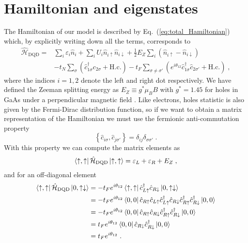 \section{Hamiltonian and eigenstates}
The Hamiltonian of our model is described by Eq.~(\ref{eq:total_Hamiltonian}) which, by explicitly writing down all the terms, corresponds to
\begin{equation}
	\begin{split}
	\hat{\mathcal{H}}_{\text{DQD}}=&\sum_{i}\varepsilon_i\hat{n}_i+\sum_{i}U_i\hat{n}_{i\uparrow}\hat{n}_{i\downarrow}+\frac{1}{2}E_Z\sum_i(\hat{n}_{i\uparrow}-\hat{n}_{i\downarrow})\\
	&-t_N\sum_{\sigma}\left(\hat{c}_{1\sigma}^\dagger c_{2\sigma}+\text{H.c.}\right)-t_F\sum_{\sigma\neq \sigma'}\left(e^{i\theta_{12}}\hat{c}_{1\sigma}^\dagger\hat{c}_{2\sigma'}+\text{H.c.}\right)\; ,
	\end{split}
\end{equation}
where the indices $i=1,2$ denote the left and right dot respectively. We have defined the Zeeman splitting energy as $E_Z\equiv g^*\mu_B B$ with $g^*=1.45$ for holes in GaAs under a perpendicular magnetic field \cite{Bogan2017}. Like electrons, holes statistic is also given by the Fermi-Dirac distribution function, so if we want to obtain a matrix representation of the Hamiltonian we must use the fermionic anti-commutation property
\begin{equation}
\left\{\hat{c}_{i\sigma},\hat{c}_{j\sigma'}\right\}=\delta_{ij}\delta_{\sigma\sigma'}\; .
\end{equation}
With this property we can compute the matrix elements as
\begin{equation}
	\begin{split}
	\bra{\uparrow,\uparrow}\hat{\mathcal{H}}_{\text{DQD}}\ket{\uparrow,\uparrow}=\varepsilon_L+\varepsilon_R+E_Z\; ,
	\end{split}
\end{equation}
and for an off-diagonal element
\begin{equation}
	\begin{split}
	\bra{\uparrow,\uparrow}\hat{\mathcal{H}}_{\text{DQD}}\ket{0,\uparrow\downarrow}&=-t_Fe^{i\theta_{12}}\bra{\uparrow,\uparrow}\hat{c}_{L\uparrow}^\dagger\hat{c}_{R\downarrow}\ket{0,\uparrow\downarrow}\\
	&=-t_Fe^{i\theta_{12}}\bra{0,0}\hat{c}_{R\uparrow}\hat{c}_{L\uparrow}\hat{c}_{L\uparrow}^\dagger \hat{c}_{R\downarrow}\hat{c}_{R\uparrow}^\dagger\hat{c}_{R\downarrow}^\dagger\ket{0,0}\\
	&=-t_Fe^{i\theta_{12}}\bra{0,0}\hat{c}_{R\uparrow}\hat{c}_{R\downarrow}\hat{c}_{R\uparrow}^\dagger \hat{c}_{R\downarrow}^\dagger\ket{0,0}\\
	&=t_Fe^{i\theta_{12}}\bra{0,0}\hat{c}_{R\downarrow} \hat{c}_{R\downarrow}^\dagger\ket{0,0}\\
	&=t_Fe^{i\theta_{12}} \; .
	\end{split}
\end{equation}
